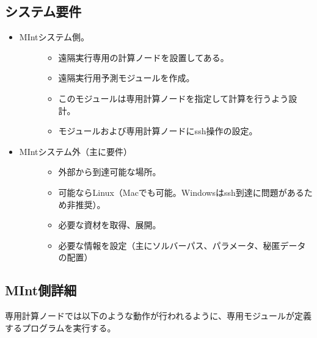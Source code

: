 \documentclass[letterpaper,10pt,dvipdfmx,openany]{sphinxmanual}
\begin{document}
\subsection{システム要件}
\label{\detokenize{using_distributed_properties:id6}}\begin{itemize}
\item {} \begin{description}
\item[{MIntシステム側。}] \leavevmode\begin{itemize}
\item {} 
遠隔実行専用の計算ノードを設置してある。

\item {} 
遠隔実行用予測モジュールを作成。

\item {} 
このモジュールは専用計算ノードを指定して計算を行うよう設計。

\item {} 
モジュールおよび専用計算ノードにssh操作の設定。

\end{itemize}

\end{description}

\item {} \begin{description}
\item[{MIntシステム外（主に要件）}] \leavevmode\begin{itemize}
\item {} 
外部から到達可能な場所。

\item {} 
可能ならLinux（Macでも可能。Windowsはssh到達に問題があるため非推奨）。

\item {} 
必要な資材を取得、展開。

\item {} 
必要な情報を設定（主にソルバーパス、パラメータ、秘匿データの配置）

\end{itemize}

\end{description}

\end{itemize}


\subsection{MInt側詳細}
\label{\detokenize{using_distributed_properties:id7}}
専用計算ノードでは以下のような動作が行われるように、専用モジュールが定義するプログラムを実行する。
\end{document}
